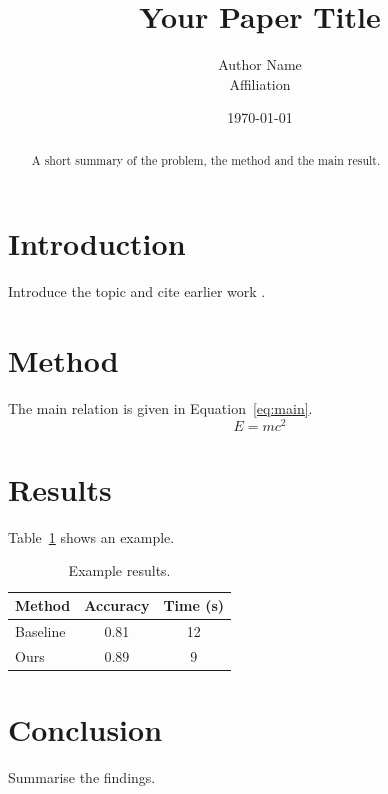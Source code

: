 \documentclass[11pt]{article}
\title{Your Paper Title}
\author{Author Name\\ \small Affiliation}
\date{\today}
\begin{document}
\maketitle

\begin{abstract}
A short summary of the problem, the method and the main result.
\end{abstract}

\section{Introduction}
Introduce the topic and cite earlier work \cite{knuth1984}.

\section{Method}
The main relation is given in Equation~\eqref{eq:main}.
\begin{equation}
  E = mc^2
  \label{eq:main}
\end{equation}

\section{Results}
Table~\ref{tab:results} shows an example.
\begin{table}[htbp]
  \centering
  \caption{Example results.}
  \label{tab:results}
  \begin{tabular}{lcc}
    \toprule
    Method & Accuracy & Time (s) \\
    \midrule
    Baseline & 0.81 & 12 \\
    Ours & 0.89 & 9 \\
    \bottomrule
  \end{tabular}
\end{table}

\section{Conclusion}
Summarise the findings.



\end{document}
